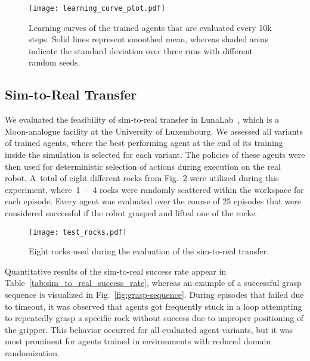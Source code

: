 \begin{figure}[ht]
	\centering
	\texttt{[image: learning\_curve\_plot.pdf]}
	\caption{Learning curves of the trained agents that are evaluated every 10k steps. Solid lines represent smoothed mean, whereas shaded areas indicate the standard deviation over three runs with different random seeds.}
	\label{fig:results-learning-curve}
\end{figure}

\subsection{Sim-to-Real Transfer}\label{ssec:sim-to-real-transfer}

We evaluated the feasibility of sim-to-real transfer in LunaLab~\cite{ludivig_building_2020}, which is a Moon-analogue facility at the University of Luxembourg. We assessed all variants of trained agents, where the best performing agent at the end of its training inside the simulation is selected for each variant. The policies of these agents were then used for deterministic selection of actions during execution on the real robot. A~total of eight different rocks from Fig.~\ref{fig:test-rocks} were utilized during this experiment, where~1~--~4 rocks were randomly scattered within the workspace for each episode. Every agent was evaluated over the course of 25 episodes that were considered successful if the robot grasped and lifted one of the rocks.

\begin{figure}[ht]
	\centering
	\texttt{[image: test\_rocks.pdf]}
	\caption{Eight rocks used during the evaluation of the sim-to-real transfer.}
	\label{fig:test-rocks}
\end{figure}

Quantitative results of the sim-to-real success rate appear in Table~\ref{tab:sim_to_real_success_rate}, whereas an example of a successful grasp sequence is visualized in Fig.~\ref{fig:grasp-sequence}. During episodes that failed due to timeout, it was observed that agents got frequently stuck in a loop attempting to repeatedly grasp a specific rock without success due to improper positioning of the gripper. This behavior occurred for all evaluated agent variants, but it was most prominent for agents trained in environments with reduced domain randomization.

